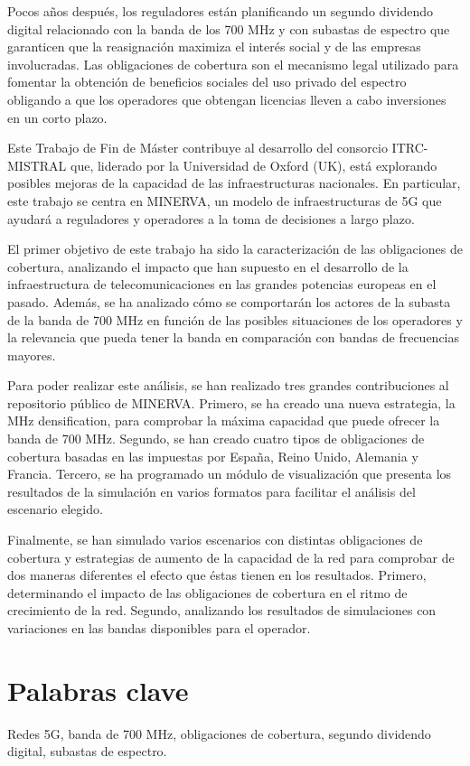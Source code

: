Pocos años después, los reguladores están planificando un segundo dividendo digital relacionado con la banda de los 700 MHz y con subastas de espectro que garanticen que la reasignación maximiza el interés social y de las empresas involucradas. Las obligaciones de cobertura son el mecanismo legal utilizado para fomentar la obtención de beneficios sociales del uso privado del espectro obligando a que los operadores que obtengan licencias lleven a cabo inversiones en un corto plazo.\par

Este Trabajo de Fin de Máster contribuye al desarrollo del consorcio ITRC-MISTRAL que, liderado por la Universidad de Oxford (UK), está explorando posibles mejoras de la capacidad de las infraestructuras nacionales. En particular, este trabajo se centra en MINERVA, un modelo de infraestructuras de 5G que ayudará a reguladores y operadores a la toma de decisiones a largo plazo.\par

El primer objetivo de este trabajo ha sido la caracterización de las obligaciones de cobertura, analizando el impacto que han supuesto en el desarrollo de la infraestructura de telecomunicaciones en las grandes potencias europeas en el pasado. Además, se ha analizado cómo se comportarán los actores de la subasta de la banda de 700 MHz en función de las posibles situaciones de los operadores y la relevancia que pueda tener la banda en comparación con bandas de frecuencias mayores.\par

Para poder realizar este análisis, se han realizado tres grandes contribuciones al repositorio público de MINERVA. Primero, se ha creado una nueva estrategia, la  MHz densification\guillemotright , para comprobar la máxima capacidad que puede ofrecer la banda de 700 MHz. Segundo, se han creado cuatro tipos de obligaciones de cobertura basadas en las impuestas por España, Reino Unido, Alemania y Francia. Tercero, se ha programado un módulo de visualización que presenta los resultados de la simulación en varios formatos para facilitar el análisis del escenario elegido.\par

Finalmente, se han simulado varios escenarios con distintas obligaciones de cobertura y estrategias de aumento de la capacidad de la red para comprobar de dos maneras diferentes el efecto que éstas tienen en los resultados. Primero, determinando el impacto de las obligaciones de cobertura en el ritmo de crecimiento de la red. Segundo, analizando los resultados de simulaciones con variaciones en las bandas disponibles para el operador.\par


\section*{Palabras clave}
Redes 5G, banda de 700 MHz, obligaciones de cobertura, segundo dividendo digital, subastas de espectro.

